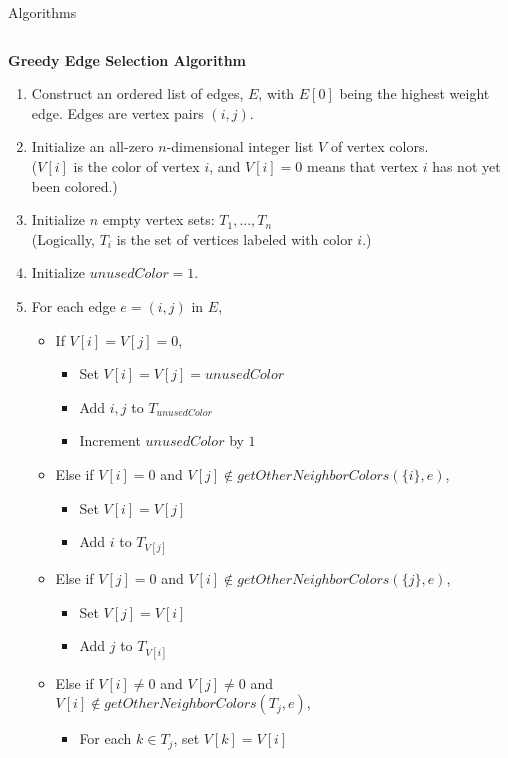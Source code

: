 \documentclass[serif,mathserif,final]{beamer}
\begin{document}
\begin{frame}{}
\begin{columns}[t]
\begin{column}{0.49\linewidth}
\begin{block}{\Huge Algorithms}
		\begin{columns}[t]
			\begin{column}{0.49\linewidth}

\begin{framed}
\noindent\textbf{Greedy Edge Selection Algorithm}
\begin{enumerate}
\item Construct an ordered list of edges, $E$, with $E[0]$ being the highest weight edge. Edges are vertex pairs $(i,j)$.
\item Initialize an all-zero $n$-dimensional integer list $V$ of vertex colors. \\
($V[i]$ is the color of vertex $i$, and $V[i]=0$ means that vertex $i$ has not yet been colored.)
\item Initialize $n$ empty vertex sets: $T_1,...,T_n$\\
(Logically, $T_i$ is the set of vertices labeled with color $i$.)
\item Initialize $unusedColor=1$.
\item For each edge $e=(i,j)$ in $E$,
\begin{itemize}
\item If $V[i]=V[j]=0$,
\begin{itemize}
\item Set $V[i]=V[j]=unusedColor$
\item Add $i,j$ to $T_{unusedColor}$
\item Increment $unusedColor$ by $1$
\end{itemize}
\item Else if $V[i]=0$ and $V[j]\notin getOtherNeighborColors(\{i\}, e)$,
\begin{itemize}
\item Set $V[i]=V[j]$
\item Add $i$ to $T_{V[j]}$
\end{itemize}
\item Else if $V[j]=0$ and $V[i]\notin getOtherNeighborColors(\{j\}, e)$,
\begin{itemize}
\item Set $V[j]=V[i]$
\item Add $j$ to $T_{V[i]}$
\end{itemize}
\item Else if  $V[i]\neq 0$ and $V[j]\neq 0$ and $V[i]\notin getOtherNeighborColors(T_j, e)$,
\begin{itemize}
\item For each $k\in T_j$, set $V[k]=V[i]$

\end{itemize}
\end{itemize}
\end{enumerate}
\end{framed}
\end{column}
\end{columns}
\end{block}
\end{column}
\end{columns}
\end{frame}
\end{document}
